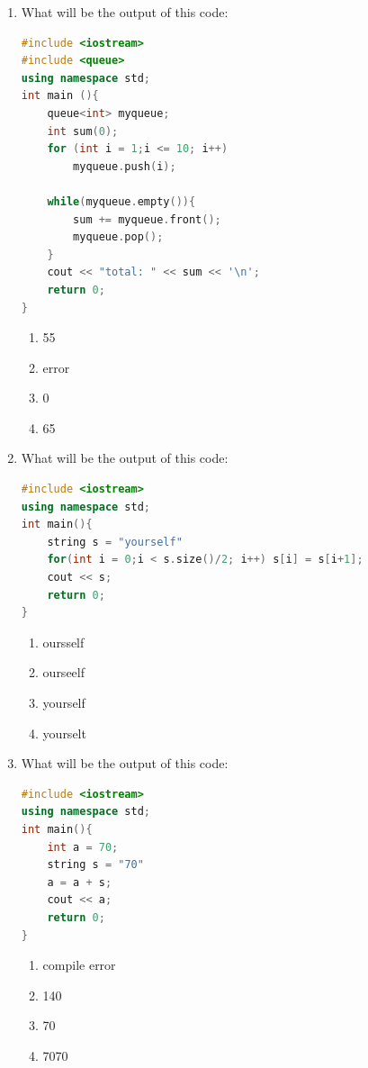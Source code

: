 \documentclass[10pt]{article}
\begin{document}
\begin{enumerate}
\item What will be the output of this code:
\begin{lstlisting}[language=C++]
#include <iostream>
#include <queue>       
using namespace std;   
int main (){
    queue<int> myqueue;
    int sum(0);
    for (int i = 1;i <= 10; i++) 
        myqueue.push(i);

    while(myqueue.empty()){
        sum += myqueue.front();
        myqueue.pop();
    }
    cout << "total: " << sum << '\n';
    return 0;
}

\end{lstlisting}
\begin{multicols}{4}
\begin{enumerate}
    \item 55
    \item error
    \item 0
    \item 65
\end{enumerate}
\end{multicols}








\item What will be the output of this code:
\begin{lstlisting}[language=C++]
#include <iostream> 
using namespace std;
int main(){
    string s = "yourself"
    for(int i = 0;i < s.size()/2; i++) s[i] = s[i+1];
    cout << s;
    return 0;
}

\end{lstlisting}
\begin{multicols}{4}
\begin{enumerate}
    \item oursself
    \item ourseelf
    \item yourself
    \item yourselt
\end{enumerate}
\end{multicols}








\item What will be the output of this code:
\begin{lstlisting}[language=C++]
#include <iostream>
using namespace std;
int main(){
	int a = 70;
	string s = "70"
	a = a + s;
	cout << a;
    return 0;
}

\end{lstlisting}
\begin{multicols}{4}
\begin{enumerate}
    \item compile error
    \item 140
    \item 70
    \item 7070
\end{enumerate}
\end{multicols}



\end{enumerate}
\end{document}
